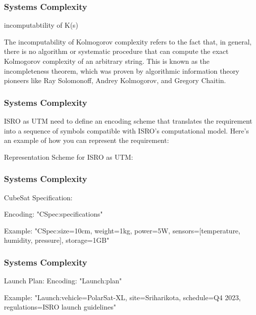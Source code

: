 \newpage
\begin{frame}
\frametitle{Systems Complexity }
\begin{block}{ incomputabtility of K(s)  }

The incomputability of Kolmogorov complexity refers to the fact that, in general, there is no algorithm or systematic procedure that can compute the exact Kolmogorov complexity of an arbitrary string. This is known as the incompleteness theorem, which was proven by algorithmic information theory pioneers like Ray Solomonoff, Andrey Kolmogorov, and Gregory Chaitin.

\end{block}
\end{frame}



\newpage
\begin{frame}
\frametitle{Systems Complexity }
\begin{block}{ ISRO as UTM }
need to define an encoding scheme that translates the requirement into a sequence of symbols compatible with ISRO's computational model. Here's an example of how you can represent the requirement:

Representation Scheme for ISRO as UTM:

\end{block}
\end{frame}


\newpage
\begin{frame}
\frametitle{Systems Complexity }
\begin{block}{ CubeSat Specification: }


Encoding: "CSpec:{specifications}"

Example: "CSpec:{size=10cm, weight=1kg, power=5W, sensors=[temperature, humidity, pressure], storage=1GB}"

\end{block}
\end{frame}


\newpage
\begin{frame}
\frametitle{Systems Complexity }
\begin{block}{ Launch Plan:}
Encoding: "Launch:{plan}"

Example: "Launch:{vehicle=PolarSat-XL, site=Sriharikota, schedule=Q4 2023, regulations=ISRO launch guidelines}"

\end{block}
\end{frame}



